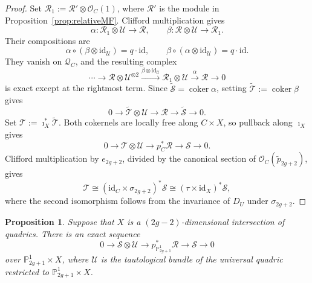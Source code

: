 \documentclass[12pt, letterpaper]{amsart}
\newtheorem{proposition}[theorem]{Proposition}
\theoremstyle{definition}
\newcommand{\PP}{\mathbb{P} }
\newcommand{\cO}{\mathcal{O} }
\newcommand{\cQ}{\mathcal{Q} }
\newcommand{\cR}{\mathcal{R} }
\newcommand{\cS}{\mathcal{S} }
\newcommand{\cT}{\mathcal{T} }
\newcommand{\cU}{\mathcal{U} }
\newcommand{\tcS}{\widetilde{\cS} }
\begin{document}
\begin{proof}
Set \(\cR_1:=\cR'\otimes\cO_C(1)\), where \(\cR'\) is the module in Proposition~\ref{prop:relativeMF}. Clifford multiplication gives
\[\alpha : \cR_1 \otimes \cU \longrightarrow \cR, \qquad \beta : \cR \otimes \cU \longrightarrow \cR_1.\]
Their compositions are
\[\alpha \circ (\beta \otimes \mathrm{id}_\cU)=q\cdot\mathrm{id},\qquad \beta \circ (\alpha \otimes \mathrm{id}_\cU)=q\cdot\mathrm{id}.\]
They vanish on \(\cQ_C\), and the resulting complex
\[\cdots \longrightarrow\cR \otimes \cU^{\otimes 2}\xrightarrow{\beta \otimes \mathrm{id}_{\cU}}\cR_1 \otimes\cU\xrightarrow{\alpha}\cR\longrightarrow 0\]
is exact except at the rightmost term. Since \(\tcS=\operatorname{coker}\alpha\), setting \(\widetilde{\cT}:=\operatorname{coker}\beta\) gives
\[0 \to \widetilde{\cT} \otimes \cU \to \cR \to \tcS \to 0.\]
Set \(\cT:=\imath_X^*\widetilde{\cT}\). Both cokernels are locally free along \(C\times X\), so pullback along \(\imath_X\) gives
\[0\longrightarrow \cT \otimes \cU \longrightarrow p_C^*\cR \longrightarrow \cS \longrightarrow 0.\]
Clifford multiplication by \(e_{2g+2}\), divided by the canonical section of \(\cO_C(\widetilde p_{2g+2})\), gives
\[\cT\cong(\mathrm{id}_C\times\sigma_{2g+2})^*\cS\cong(\tau\times\mathrm{id}_X)^*\cS,\]
where the second isomorphism follows from the invariance of \(D_U\) under \(\sigma_{2g+2}\).
\end{proof}

\begin{proposition}\label{prop:filtrationodd}
Suppose that \(X\) is a \((2g-2)\)-dimensional intersection of quadrics. There is an exact sequence
\begin{equation}\label{eqn:Raynaudfiltrationodd}
0 \to \cS \otimes \cU \to p_{\PP_{2g+1}^1}^*\cR \to \cS \to 0
\end{equation}
over \(\PP_{2g+1}^1 \times X\), where \(\cU\) is the tautological bundle of the universal quadric restricted to \(\PP_{2g+1}^1 \times X\).
\end{proposition}
\end{document}
